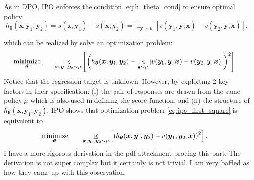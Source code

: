 \documentclass[11pt,a4paper]{article}
\begin{document}
As in DPO, IPO enforces the condition \eqref{eq:h_theta_cond} to ensure optimal policy:
\[
h_{\boldsymbol \theta}(\bm{x}, \bm{y}_1, \bm{y}_2) = s(\bm{x}, \bm{y}_1) - s(\bm{x}, \bm{y}_2) = \mathop{\mathbb{E}}_{\bm{y} \sim \mu}[v(\bm{y}_1, \bm{y}, \bm{x}) - v(\bm{y}_2, \bm{y}, \bm{x})],
\]

which can be realized by solve an optimization problem:
\begin{alignat}{2}
    \label{eq:ipo_first_square}
    & \operatorname*{\text{minimize}}_{\boldsymbol \theta} \quad && \mathop{\mathbb{E}}_{\bm{x}, \bm{y}_1, \bm{y}_2\sim \mu} \left[ \left(  h_{\boldsymbol \theta}(\bm{x}, \bm{y}_1, \bm{y}_2)  - \mathop{\mathbb{E}}_{\bm{y} \sim \mu}\left[v(\bm{y}_1, \bm{y}, \bm{x}) - v(\bm{y}_2, \bm{y}, \bm{x}) \right] \right) ^2\right]
\end{alignat}
Notice that the regression target is unknown. However, by exploiting 2 key factors in their specification: (i) the pair of responses are drawn from the same policy $\mu$ which is also used in defining the score function, and (ii) the structure of $h_{\boldsymbol \theta}(\bm{x}, \bm{y}_1, \bm{y}_2)$, IPO shows that optimization problem \eqref{eq:ipo_first_square} is equivalent to
\begin{alignat}{2}
    \label{eq:ipo_square_2}
    & \operatorname*{\text{minimize}}_{\boldsymbol \theta} \quad && \mathop{\mathbb{E}}_{\bm{x}, \bm{y}_1, \bm{y}_2\sim \mu} \left[ \left(  h_{\boldsymbol \theta}(\bm{x}, \bm{y}_1, \bm{y}_2)  - v(\bm{y}_1, \bm{y}_2, \bm{x}) \right) ^2\right].
\end{alignat}
I have a more rigorous derivation in the pdf attachment proving this part. The derivation is not super complex but it certainly is not trivial. I am very baffled as how they came up with this observation. 
\end{document}
